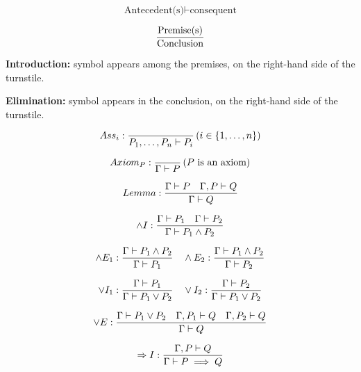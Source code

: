 \newcommand{\sequent}[2]{{\displaystyle #1\over\displaystyle #2}}

$$\text{Antecedent(s)} \vdash \text{consequent}$$

$$
\sequent{
  \text{Premise(s)}
}{
  \text{Conclusion}
}
$$

\textbf{Introduction:} symbol appears among the premises, on the right-hand
side of the turnstile.

\textbf{Elimination:} symbol appears in the conclusion, on the right-hand side
of the turnstile.

$$
Ass_i:
\sequent{
}{
  P_1,\ldots,P_n \vdash P_i
}
\p{i\in\set{1,\ldots,n}}
$$

$$
Axiom_P:
\sequent{
}{
  \Gamma \vdash P
}
\p{P\ \text{is an axiom}}
$$

$$
Lemma:
\sequent{
  \Gamma \vdash P \quad \Gamma, P \vdash Q
}{
  \Gamma \vdash Q
}
$$

$$
\wedge I:
\sequent{
  \Gamma \vdash P_1 \quad \Gamma \vdash P_2
}{
  \Gamma \vdash P_1 \wedge P_2
}
$$

$$
\wedge E_1:
\sequent{
  \Gamma \vdash P_1 \wedge P_2
}{
  \Gamma \vdash P_1
}
\quad
\wedge E_2:
\sequent{
  \Gamma \vdash P_1 \wedge P_2
}{
  \Gamma \vdash P_2
}
$$

$$
\vee I_1:
\sequent{
  \Gamma \vdash P_1
}{
  \Gamma \vdash P_1 \vee P_2
}
\quad
\vee I_2:
\sequent{
  \Gamma \vdash P_2
}{
  \Gamma \vdash P_1 \vee P_2
}
$$

$$
\vee E:
\sequent{
  \Gamma \vdash P_1 \vee P_2
  \quad
  \Gamma, P_1 \vdash Q
  \quad
  \Gamma, P_2 \vdash Q
}{
  \Gamma \vdash Q
}
$$

$$
\Rightarrow I:
\sequent{
  \Gamma, P \vdash Q
}{
  \Gamma \vdash P \implies Q
}
$$

